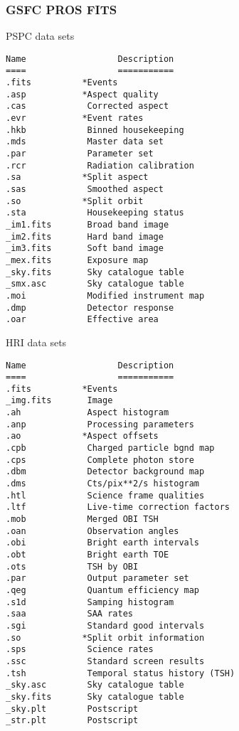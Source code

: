 \documentclass{book}
\renewcommand{\_}{{\tt\char'137}}     %
\begin{document}
\subsubsection{GSFC PROS FITS}
PSPC data sets
\begin{verbatim}
Name                  Description
====                  ===========
.fits          *Events
.asp           *Aspect quality
.cas            Corrected aspect
.evr           *Event rates
.hkb            Binned housekeeping
.mds            Master data set
.par            Parameter set
.rcr            Radiation calibration
.sa            *Split aspect
.sas            Smoothed aspect
.so            *Split orbit
.sta            Housekeeping status
_im1.fits       Broad band image
_im2.fits       Hard band image
_im3.fits       Soft band image
_mex.fits       Exposure map
_sky.fits       Sky catalogue table
_smx.asc        Sky catalogue table
.moi            Modified instrument map
.dmp            Detector response
.oar            Effective area
\end{verbatim}
HRI data sets
\begin{verbatim}
Name                  Description
====                  ===========
.fits          *Events
_img.fits       Image
.ah             Aspect histogram
.anp            Processing parameters
.ao            *Aspect offsets
.cpb            Charged particle bgnd map
.cps            Complete photon store
.dbm            Detector background map
.dms            Cts/pix**2/s histogram
.htl            Science frame qualities
.ltf            Live-time correction factors
.mob            Merged OBI TSH
.oan            Observation angles
.obi            Bright earth intervals
.obt            Bright earth TOE
.ots            TSH by OBI
.par            Output parameter set
.qeg            Quantum efficiency map
.s1d            Samping histogram
.saa            SAA rates
.sgi            Standard good intervals
.so            *Split orbit information
.sps            Science rates
.ssc            Standard screen results
.tsh            Temporal status history (TSH)
_sky.asc        Sky catalogue table
_sky.fits       Sky catalogue table
_sky.plt        Postscript
_str.plt        Postscript
\end{verbatim}
\end{document}
